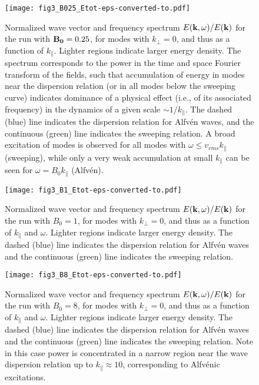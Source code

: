 \documentclass[aip,pop,reprint,amsmath,amssymb,floatfix]{revtex4-1}
\begin{document}
\begin{figure}
  \centering 
  \texttt{[image: fig3\_B025\_Etot-eps-converted-to.pdf]}
  \caption{Normalized wave vector and frequency spectrum $E({\bf k},
    \omega)/E({\bf k})$ for the run with ${\bf B_0}=0.25$, for modes
    with $k_\perp=0$, and thus as a function of $k_\parallel$. Lighter
    regions indicate larger energy density. The spectrum corresponds
    to the power in the time and space Fourier transform of the
    fields, such that accumulation of energy in modes near the
    dispersion relation (or in all modes below the sweeping curve)
    indicates dominance of a physical effect (i.e., of its associated
    frequency) in the dynamics of a given scale $\sim
    1/k_\parallel$. The dashed (blue) line indicates the dispersion
    relation for Alfv\'en waves, and the continuous (green) line
    indicates the sweeping relation. A broad excitation of modes is
    observed for all modes with $\omega \leq v_{rms} k_\parallel$
    (sweeping), while only a very weak accumulation at small
    $k_\parallel$ can be seen for $\omega=B_0 k_\parallel$
    (Alfv\'en).}
  \label{fig3:B025_bvf_Etot_kperp0}
\end{figure}

\begin{figure}
  \centering
  \texttt{[image: fig3\_B1\_Etot-eps-converted-to.pdf]}
  \caption{Normalized wave vector and frequency spectrum $E({\bf k},
    \omega)/E({\bf k})$ for the run with $B_0=1$, for modes with
    $k_\perp=0$, and thus as a function of $k_\parallel$ and
    $\omega$. Lighter regions indicate larger energy density. The
    dashed (blue) line indicates the dispersion relation for Alfv\'en
    waves and the continuous (green) line indicates the sweeping
    relation.}
  \label{fig3:B1_bvf_Etot_kperp0}
\end{figure}

\begin{figure}
  \centering
  \texttt{[image: fig3\_B8\_Etot-eps-converted-to.pdf]}
  \caption{Normalized wave vector and frequency spectrum $E({\bf k},
    \omega)/E({\bf k})$ for the run with $B_0=8$, for modes with
    $k_\perp=0$, and thus as a function of $k_\parallel$ and
    $\omega$. Lighter regions indicate larger energy density. The
    dashed (blue) line indicates the dispersion relation for Alfv\'en
    waves and the continuous (green) line indicates the sweeping
    relation. Note in this case power is concentrated in a narrow
    region near the wave dispersion relation up to 
    $k_\parallel \approx 10$, corresponding to Alfv\'enic
    excitations.}
  \label{fig3:B8_bvf_Etot_kperp0}
\end{figure}
\end{document}
